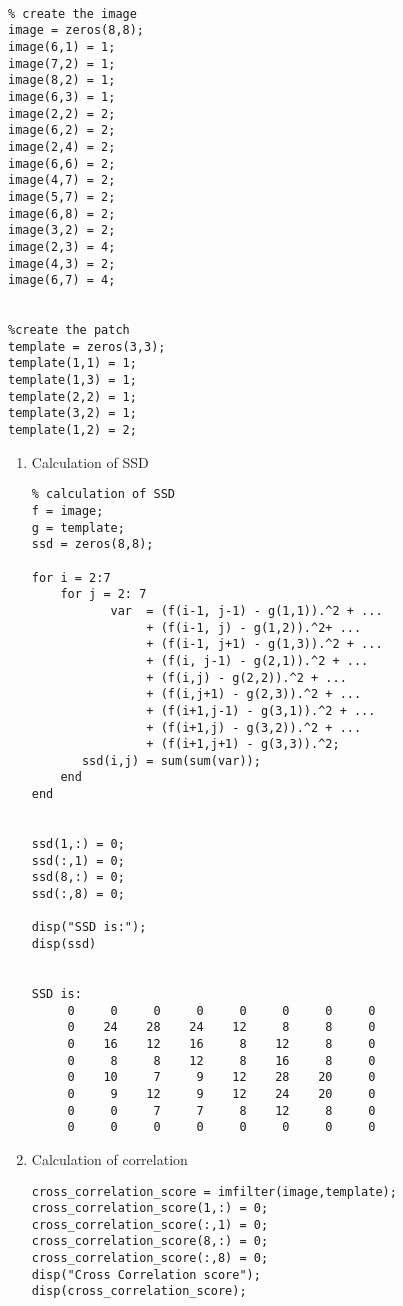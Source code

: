 \documentclass{article}
\begin{document}
\begin{verbatim}

% create the image
image = zeros(8,8);
image(6,1) = 1;
image(7,2) = 1;
image(8,2) = 1;
image(6,3) = 1;
image(2,2) = 2;
image(6,2) = 2;
image(2,4) = 2;
image(6,6) = 2;
image(4,7) = 2;
image(5,7) = 2;
image(6,8) = 2;
image(3,2) = 2;
image(2,3) = 4;
image(4,3) = 2;
image(6,7) = 4;


%create the patch
template = zeros(3,3);
template(1,1) = 1;
template(1,3) = 1;
template(2,2) = 1;
template(3,2) = 1;
template(1,2) = 2;

\end{verbatim}  

\begin{enumerate}
\item  Calculation of SSD \\
  \begin{verbatim}
% calculation of SSD
f = image;
g = template;
ssd = zeros(8,8);

for i = 2:7
    for j = 2: 7
           var  = (f(i-1, j-1) - g(1,1)).^2 + ...
                + (f(i-1, j) - g(1,2)).^2+ ...
                + (f(i-1, j+1) - g(1,3)).^2 + ...
                + (f(i, j-1) - g(2,1)).^2 + ...
                + (f(i,j) - g(2,2)).^2 + ...
                + (f(i,j+1) - g(2,3)).^2 + ...
                + (f(i+1,j-1) - g(3,1)).^2 + ...
                + (f(i+1,j) - g(3,2)).^2 + ...
                + (f(i+1,j+1) - g(3,3)).^2;
       ssd(i,j) = sum(sum(var));
    end
end
        

ssd(1,:) = 0;
ssd(:,1) = 0;
ssd(8,:) = 0;
ssd(:,8) = 0;

disp("SSD is:");
disp(ssd)


SSD is:
     0     0     0     0     0     0     0     0
     0    24    28    24    12     8     8     0
     0    16    12    16     8    12     8     0
     0     8     8    12     8    16     8     0
     0    10     7     9    12    28    20     0
     0     9    12     9    12    24    20     0
     0     0     7     7     8    12     8     0
     0     0     0     0     0     0     0     0
  \end{verbatim}

\item Calculation of correlation

  \begin{verbatim}
cross_correlation_score = imfilter(image,template);
cross_correlation_score(1,:) = 0;
cross_correlation_score(:,1) = 0;
cross_correlation_score(8,:) = 0;
cross_correlation_score(:,8) = 0;
disp("Cross Correlation score");
disp(cross_correlation_score);


\end{verbatim}
\end{enumerate}
\end{document}
